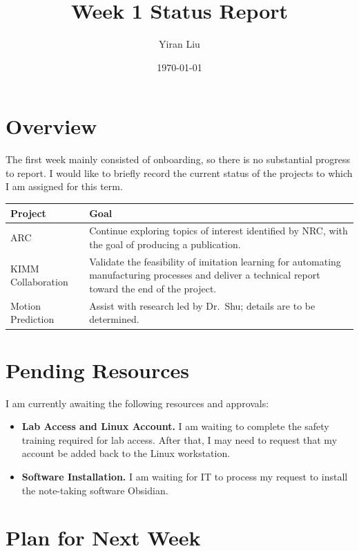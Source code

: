 \documentclass[11pt]{article}
\title{Week 1 Status Report}
\author{Yiran Liu}
\date{\today}
\begin{document}
\maketitle

\section{Overview}

The first week mainly consisted of onboarding, so there is no substantial progress to report. I would like to briefly record the current status of the projects to which I am assigned for this term.

\begin{table}[h]
    \centering
    \begin{tabularx}{\linewidth}{|l|X|}
        \hline
        \textbf{Project} & \textbf{Goal} \\
        \hline
        ARC & Continue exploring topics of interest identified by NRC, with the goal of producing a publication. \\
        \hline
        KIMM Collaboration & Validate the feasibility of imitation learning for automating manufacturing processes and deliver a technical report toward the end of the project. \\
        \hline
        Motion Prediction & Assist with research led by Dr.\ Shu; details are to be determined. \\
        \hline
    \end{tabularx}
\end{table}

\section{Pending Resources}

I am currently awaiting the following resources and approvals:

\begin{itemize}
    \item \textbf{Lab Access and Linux Account.} I am waiting to complete the safety training required for lab access. After that, I may need to request that my account be added back to the Linux workstation.
    
    \item \textbf{Software Installation.} I am waiting for IT to process my request to install the note-taking software Obsidian.
\end{itemize}

\section{Plan for Next Week}
\end{document}
